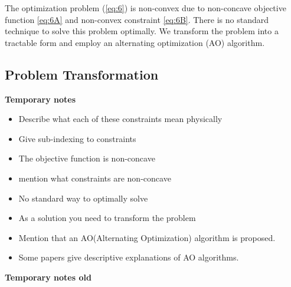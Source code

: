 \documentclass[lettersize,journal]{IEEEtran}
\begin{document}
The optimization problem (\ref{eq:6}) is non-convex due to non-concave objective function \eqref{eq:6A} and non-convex constraint \eqref{eq:6B}. There is no standard technique to solve this problem optimally. We transform the problem into a tractable form and employ an alternating optimization (AO) algorithm.

\subsection{Problem Transformation}

\textbf{Temporary notes}

\begin{itemize}

\item Describe what each of these constraints mean physically
\item Give sub-indexing to constraints
\item The objective function is non-concave
\item mention what constraints are non-concave
\item No standard way to optimally solve
\item As a solution you need to transform the problem
\item Mention that an AO(Alternating Optimization) algorithm is proposed.
\item Some papers give descriptive explanations of AO algorithms.


\end{itemize}

\textbf{Temporary notes old}
\end{document}
